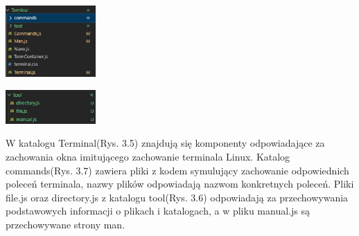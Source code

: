 \documentclass[10pt,a4paper]{report}
\begin{document}
\begin{adjustwidth}{2cm}{2cm}
\begin{multicols}{2}
\begin{minipage}{\linewidth}
\begin{center}
  \includegraphics[width=130px]{code/terminal.png}
\end{center}
\end{minipage}
\begin{minipage}{\linewidth}
\begin{center}
  \includegraphics[width=130px]{code/tool.png}
\end{center}
\end{minipage}
\end{multicols}
\begin{adjustwidth}{0cm}{0cm}
\begin{minipage}{\linewidth}
W katalogu Terminal(Rys. 3.5) znajdują się komponenty odpowiadające za zachowania okna imitującego zachowanie terminala Linux. Katalog commands(Rys. 3.7) zawiera pliki z kodem symulujący zachowanie odpowiednich poleceń terminala, nazwy plików odpowiadają nazwom konkretnych poleceń. Pliki file.js oraz directory.js z katalogu tool(Rys. 3.6) odpowiadają za przechowywania podstawowych informacji o plikach i katalogach, a w pliku manual.js są przechowywane strony man.
\end{minipage}
\end{adjustwidth}

\end{adjustwidth}
\end{document}
